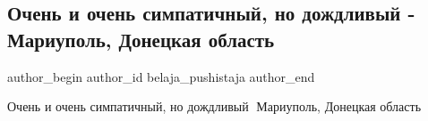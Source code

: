  
 
 
 
 

\subsection{Очень и очень симпатичный, но дождливый - Мариуполь, Донецкая область}
\label{sec:18_07_2021.fb.belaja_pushistaja.1.ochen_i_ochen_simpat}

\ifcmt
 author_begin
   author_id belaja_pushistaja
 author_end
\fi

Очень и очень симпатичный, но дождливый🙂 Мариуполь, Донецкая область
